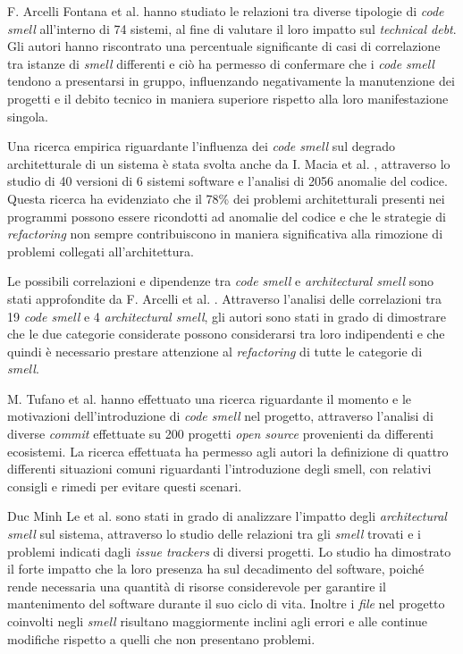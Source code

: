 F. Arcelli Fontana et al. \cite{arcelli2015codesmellrelations} hanno studiato le relazioni tra diverse tipologie di \textit{code smell} all'interno di 74 sistemi, al fine di valutare il loro impatto sul \textit{technical debt}. Gli autori hanno riscontrato una percentuale significante di casi di correlazione tra istanze di \textit{smell} differenti e ciò ha permesso di confermare che i \textit{code smell} tendono a presentarsi in gruppo, influenzando negativamente la manutenzione dei progetti e il debito tecnico in maniera superiore rispetto alla loro manifestazione singola.

Una ricerca empirica riguardante l'influenza dei \textit{code smell} sul degrado architetturale di un sistema è stata svolta anche da I. Macia et al. \cite{macia2014codeanomalies}, attraverso lo studio di 40 versioni di 6 sistemi software e l'analisi di 2056 anomalie del codice. Questa ricerca ha evidenziato che il 78\% dei problemi architetturali presenti nei programmi possono essere ricondotti ad anomalie del codice e che le strategie di \textit{refactoring} non sempre contribuiscono in maniera significativa alla rimozione di problemi collegati all'architettura.

Le possibili correlazioni e dipendenze tra \textit{code smell} e \textit{architectural smell} sono stati approfondite da F. Arcelli et al. \cite{arcelli2019dependency}. Attraverso l'analisi delle correlazioni tra 19 \textit{code smell} e 4 \textit{architectural smell}, gli autori sono stati in grado di dimostrare che le due categorie considerate possono considerarsi tra loro indipendenti e che quindi è necessario prestare attenzione al \textit{refactoring} di tutte le categorie di \textit{smell}.

M. Tufano et al. \cite{tufano2015whenwhy} hanno effettuato una ricerca riguardante il momento e le motivazioni dell'introduzione di \textit{code smell} nel progetto, attraverso l'analisi di diverse \textit{commit} effettuate su 200 progetti \textit{open source} provenienti da differenti ecosistemi. La ricerca effettuata ha permesso agli autori la definizione di quattro differenti situazioni comuni riguardanti l'introduzione degli smell, con relativi consigli e rimedi per evitare questi scenari.


Duc Minh Le et al. \cite{mihn2018architecturaldecay} sono stati in grado di analizzare l'impatto degli \textit{architectural smell} sul sistema, attraverso lo studio delle relazioni tra gli \textit{smell} trovati e i problemi indicati dagli \textit{issue trackers} di diversi progetti. Lo studio ha dimostrato il forte impatto che la loro presenza ha sul decadimento del software, poiché rende necessaria una quantità di risorse considerevole per garantire il mantenimento del software durante il suo ciclo di vita. 
Inoltre i \textit{file} nel progetto coinvolti negli \textit{smell} risultano maggiormente inclini agli errori e alle continue modifiche rispetto a quelli che non presentano problemi.

